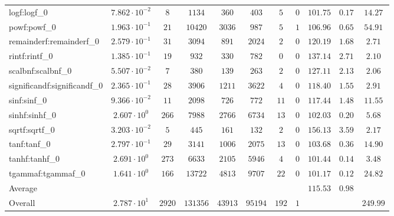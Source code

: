 \begin{tabular}{|l|c|c|c|c|c|c|c|c|c|c|}
logf:logf\_0                 & $ 7.862 \cdot 10^{-2} $ & $ 8      $ & $ 1134   $ & $ 360   $ & $ 403   $ & $ 5   $ & $ 0 $ & $ 101.75      $ & $ 0.17    $ & $ 14.27   $ \\
powf:powf\_0                 & $ 1.963 \cdot 10^{-1} $ & $ 21     $ & $ 10420  $ & $ 3036  $ & $ 987   $ & $ 5   $ & $ 1 $ & $ 106.96      $ & $ 0.65    $ & $ 54.91   $ \\
remainderf:remainderf\_0     & $ 2.579 \cdot 10^{-1} $ & $ 31     $ & $ 3094   $ & $ 891   $ & $ 2024  $ & $ 2   $ & $ 0 $ & $ 120.19      $ & $ 1.68    $ & $ 2.71    $ \\
rintf:rintf\_0               & $ 1.385 \cdot 10^{-1} $ & $ 19     $ & $ 932    $ & $ 330   $ & $ 782   $ & $ 0   $ & $ 0 $ & $ 137.14      $ & $ 2.71    $ & $ 2.10    $ \\
scalbnf:scalbnf\_0           & $ 5.507 \cdot 10^{-2} $ & $ 7      $ & $ 380    $ & $ 139   $ & $ 263   $ & $ 2   $ & $ 0 $ & $ 127.11      $ & $ 2.13    $ & $ 2.06    $ \\
significandf:significandf\_0 & $ 2.365 \cdot 10^{-1} $ & $ 28     $ & $ 3906   $ & $ 1211  $ & $ 3622  $ & $ 4   $ & $ 0 $ & $ 118.40      $ & $ 1.55    $ & $ 2.91    $ \\
sinf:sinf\_0                 & $ 9.366 \cdot 10^{-2} $ & $ 11     $ & $ 2098   $ & $ 726   $ & $ 772   $ & $ 11  $ & $ 0 $ & $ 117.44      $ & $ 1.48    $ & $ 11.55   $ \\
sinhf:sinhf\_0               & $ 2.607 \cdot 10^{0}  $ & $ 266    $ & $ 7988   $ & $ 2766  $ & $ 6734  $ & $ 13  $ & $ 0 $ & $ 102.03      $ & $ 0.20    $ & $ 5.68    $ \\
sqrtf:sqrtf\_0               & $ 3.203 \cdot 10^{-2} $ & $ 5      $ & $ 445    $ & $ 161   $ & $ 132   $ & $ 2   $ & $ 0 $ & $ 156.13      $ & $ 3.59    $ & $ 2.17    $ \\
tanf:tanf\_0                 & $ 2.797 \cdot 10^{-1} $ & $ 29     $ & $ 3141   $ & $ 1006  $ & $ 2075  $ & $ 13  $ & $ 0 $ & $ 103.68      $ & $ 0.36    $ & $ 14.90   $ \\
tanhf:tanhf\_0               & $ 2.691 \cdot 10^{0}  $ & $ 273    $ & $ 6633   $ & $ 2105  $ & $ 5946  $ & $ 4   $ & $ 0 $ & $ 101.44      $ & $ 0.14    $ & $ 3.48    $ \\
tgammaf:tgammaf\_0           & $ 1.641 \cdot 10^{0}  $ & $ 166    $ & $ 13722  $ & $ 4813  $ & $ 9707  $ & $ 22  $ & $ 0 $ & $ 101.17      $ & $ 0.12    $ & $ 24.82   $ \\
\hline
Average                      & $                     $ & $        $ & $        $ & $       $ & $       $ & $     $ & $   $ & $ 115.53      $ & $ 0.98    $ & $         $ \\
\hline
Overall                      & $ 2.787 \cdot 10^{1}  $ & $ 2920   $ & $ 131356 $ & $ 43913 $ & $ 95194 $ & $ 192 $ & $ 1 $ & $             $ & $         $ & $ 249.99  $ \\
\hline
\end{tabular}
